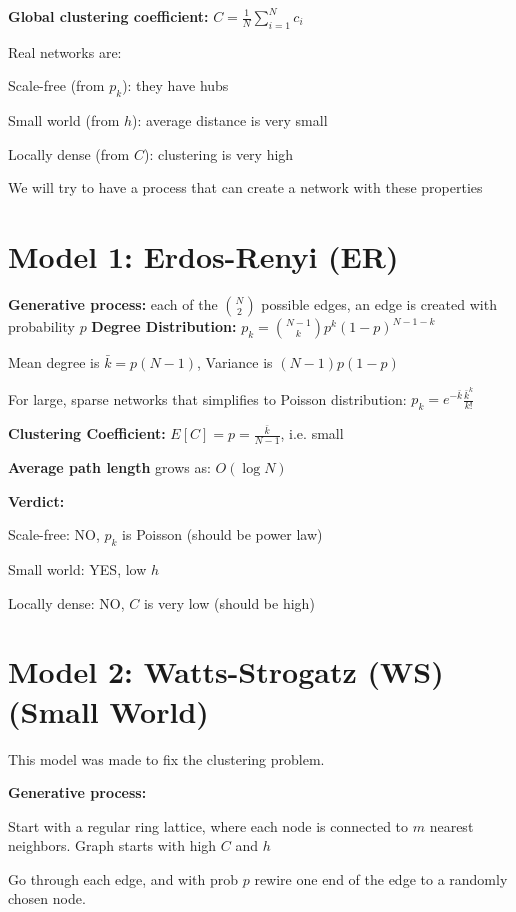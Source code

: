 \textbf{Global clustering coefficient:} $C = \frac{1}{N}\sum_{i=1}^{N}c_i$

Real networks are: 
\begin{tightitemize}
    \item Scale-free (from $p_k$): they have hubs
    \item Small world (from $h$): average distance is very small 
    \item Locally dense (from $C$): clustering is very high
\end{tightitemize}

We will try to have a process that can create a network with these properties 

\section*{Model 1: Erdos-Renyi (ER)}


\textbf{Generative process:} each of the $\binom{N}{2}$ possible edges, an edge is created with 
probability $p$
\textbf{Degree Distribution:} 
$
p_k = \binom{N-1}{k}p^k (1-p)^{N-1-k}
$

Mean degree is $\bar{k} = p(N-1)$, Variance is $(N-1)p(1-p)$

For large, sparse networks that simplifies to Poisson distribution:
$
p_k = e^{-\bar{k}} \frac{\bar{k}^k}{k!}
$

\textbf{Clustering Coefficient:} $E[C] = p = \frac{\bar{k}}{N-1}$, i.e. small

\textbf{Average path length} grows as: $O(\log N)$

\textbf{Verdict:}
\begin{tightitemize}
    \item Scale-free: NO, $p_k$ is Poisson (should be power law)
    \item Small world: YES, low $h$
    \item Locally dense: NO, $C$ is very low (should be high)
\end{tightitemize}

\section*{Model 2: Watts-Strogatz (WS) (Small World)}

This model was made to fix the clustering problem. 

\textbf{Generative process:}
\begin{tightitemize}
    \item Start with a regular ring lattice, where each node is connected to 
    $m$ nearest neighbors. Graph starts with high $C$ and $h$
    \item Go through each edge, and with prob $p$ rewire one end of the edge 
    to a randomly chosen node. 
\end{tightitemize}

